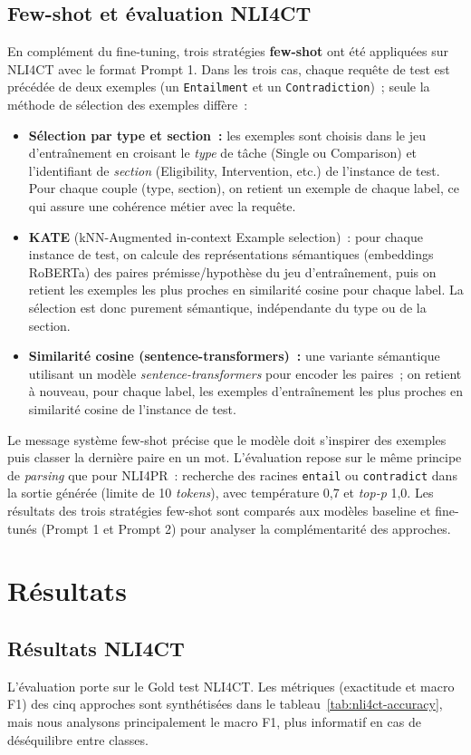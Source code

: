 \documentclass[10pt,twoside]{article}
\begin{document}
\subsection{Few-shot et évaluation NLI4CT}
En complément du fine-tuning, trois stratégies \textbf{few-shot} ont été appliquées sur NLI4CT avec le format Prompt 1. Dans les trois cas, chaque requête de test est précédée de deux exemples (un \texttt{Entailment} et un \texttt{Contradiction})~; seule la méthode de sélection des exemples diffère~:
\begin{itemize}
    \item \textbf{Sélection par type et section~:} les exemples sont choisis dans le jeu d'entraînement en croisant le \textit{type} de tâche (Single ou Comparison) et l'identifiant de \textit{section} (Eligibility, Intervention, etc.) de l'instance de test. Pour chaque couple (type, section), on retient un exemple de chaque label, ce qui assure une cohérence métier avec la requête.
    \item \textbf{KATE} (kNN-Augmented in-context Example selection)~: pour chaque instance de test, on calcule des représentations sémantiques (embeddings RoBERTa) des paires prémisse/hypothèse du jeu d'entraînement, puis on retient les exemples les plus proches en similarité cosine pour chaque label. La sélection est donc purement sémantique, indépendante du type ou de la section.
    \item \textbf{Similarité cosine (sentence-transformers)~:} une variante sémantique utilisant un modèle \textit{sentence-transformers} pour encoder les paires~; on retient à nouveau, pour chaque label, les exemples d'entraînement les plus proches en similarité cosine de l'instance de test.
\end{itemize}
Le message système few-shot précise que le modèle doit s'inspirer des exemples puis classer la dernière paire en un mot. L'évaluation repose sur le même principe de \textit{parsing} que pour NLI4PR~: recherche des racines \texttt{entail} ou \texttt{contradict} dans la sortie générée (limite de 10 \textit{tokens}), avec température 0,7 et \textit{top-p} 1,0. Les résultats des trois stratégies few-shot sont comparés aux modèles baseline et fine-tunés (Prompt 1 et Prompt 2) pour analyser la complémentarité des approches.


\section{Résultats}

\subsection{Résultats NLI4CT}
L'évaluation porte sur le Gold test NLI4CT. Les métriques (exactitude et macro F1) des cinq approches sont synthétisées dans le tableau~\ref{tab:nli4ct-accuracy}, mais nous analysons principalement le macro F1, plus informatif en cas de déséquilibre entre classes.
\end{document}
